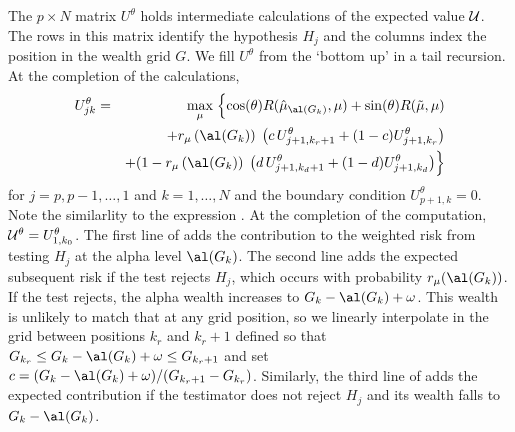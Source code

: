 \documentclass[12pt]{article}
\begin{document}
 The $p \times N$ matrix $U^{\theta}$ holds intermediate calculations of the
 expected value $\cal U$.  The rows in this matrix identify the hypothesis $H_j$
 and the columns index the position in the wealth grid $G$.  We fill $U^\theta$
 from the `bottom up' in a tail recursion.  At the completion of the
 calculations,
 \begin{eqnarray}
   U^\theta_{jk} &=&  \max_\mu \;\Bigl\{
     \cos(\theta) R(\hat\mu_{\al(G_k)}, \mu) + \sin(\theta) R(\tilde{\mu},\mu) \cr
     & &+ r_\mu\left(\al(G_k)\right) \;
          \left(c \,U^{\theta}_{j+1,k_r+1} + (1-c) U^{\theta}_{j+1,k_r}\right) \cr
     & & + (1- r_\mu\left(\al(G_k)\right) \; 
          \left(d \,U^{\theta}_{j+1,k_d+1} + (1-d) U^{\theta}_{j+1,k_d}\right)   
     \Bigr\}
 \label{eq:Ujk}
 \end{eqnarray}
 for $j=p, p-1,\ldots,1$ and $k = 1,\ldots,N$ and the boundary condition
 $U^\theta_{p+1,k} = 0$.  Note the similarlity to the expression
 .  At the completion of the computation, ${\cal U}^\theta =
 U^{\theta}_{1,k_0}$.  The first line of  adds the contribution to
 the weighted risk from testing $H_j$ at the alpha level $\al(G_k)$.  The second
 line adds the expected subsequent risk if the test rejects $H_j$, which occurs
 with probability $r_\mu(\al(G_k))$.  If the test rejects, the alpha wealth
 increases to $G_k - \al(G_k) + \omega$.  This wealth is unlikely to match that
 at any grid position, so we linearly interpolate in the grid between positions
 $k_r$ and $k_r+1$ defined so that $G_{k_r} \le G_k - \al(G_k) + \omega \le G_{k_r+1}$ and
 set $c = (G_k - \al(G_k) + \omega)/(G_{k_r+1}-G_{k_r})$.  Similarly, the third line of
  adds the expected contribution if the testimator does not reject
 $H_j$ and its wealth falls to $G_k - \al(G_k)$.

\end{document}
